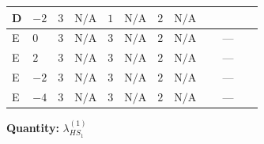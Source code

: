 \documentclass[8pt]{article}
\begin{document}
\begin{landscape}
\begin{longtable}{@{}llcccccc >{\raggedright\arraybackslash}p{0.21\linewidth} >{\raggedright\arraybackslash}p{0.21\linewidth} >{\raggedright\arraybackslash}p{0.21\linewidth}@{}}
D & $-2$ & $3$ & $\text{N/A}$ & $1$ & $\text{N/A}$ & $2$ & $\text{N/A}$ & \scriptsize\adjustbox{max width=\linewidth}{$\begin{gathered} -\frac{15 {g_1}^2 {\lambda_{HS_1}^{(1)}}}{2}\end{gathered}$} & \scriptsize\adjustbox{max width=\linewidth}{$\begin{gathered} +2 {\lambda_{12}^{(1)}} {\lambda_{HS_2}^{(1)}}\end{gathered}$} & \scriptsize\adjustbox{max width=\linewidth}{$\begin{gathered} +6 {\lambda_1} {\lambda_{HS_1}^{(1)}}\end{gathered}$} \\
\midrule
E & $0$ & $3$ & $\text{N/A}$ & $3$ & $\text{N/A}$ & $2$ & $\text{N/A}$ & \scriptsize\adjustbox{max width=\linewidth}{$\begin{gathered} -\frac{3 {g_1}^2 {\lambda_{HS_1}^{(1)}}}{2}\end{gathered}$} & --- & \scriptsize\adjustbox{max width=\linewidth}{$\begin{gathered} +6 {\lambda_1} {\lambda_{HS_1}^{(1)}}\end{gathered}$} \\
\midrule
E & $2$ & $3$ & $\text{N/A}$ & $3$ & $\text{N/A}$ & $2$ & $\text{N/A}$ & \scriptsize\adjustbox{max width=\linewidth}{$\begin{gathered} -\frac{15 {g_1}^2 {\lambda_{HS_1}^{(1)}}}{2}\end{gathered}$} & --- & \scriptsize\adjustbox{max width=\linewidth}{$\begin{gathered} +6 {\lambda_1} {\lambda_{HS_1}^{(1)}}\end{gathered}$} \\
\midrule
E & $-2$ & $3$ & $\text{N/A}$ & $3$ & $\text{N/A}$ & $2$ & $\text{N/A}$ & \scriptsize\adjustbox{max width=\linewidth}{$\begin{gathered} -\frac{15 {g_1}^2 {\lambda_{HS_1}^{(1)}}}{2}\end{gathered}$} & --- & \scriptsize\adjustbox{max width=\linewidth}{$\begin{gathered} +6 {\lambda_1} {\lambda_{HS_1}^{(1)}}\end{gathered}$} \\
\midrule
E & $-4$ & $3$ & $\text{N/A}$ & $3$ & $\text{N/A}$ & $2$ & $\text{N/A}$ & \scriptsize\adjustbox{max width=\linewidth}{$\begin{gathered} -\frac{51 {g_1}^2 {\lambda_{HS_1}^{(1)}}}{2}\end{gathered}$} & --- & \scriptsize\adjustbox{max width=\linewidth}{$\begin{gathered} +6 {\lambda_1} {\lambda_{HS_1}^{(1)}}\end{gathered}$} \\
\midrule
\bottomrule
\end{longtable}
\clearpage
\noindent\textbf{Quantity: }$\lambda_{HS_1}^{(1)}$\par\smallskip

\end{landscape}
\end{document}
